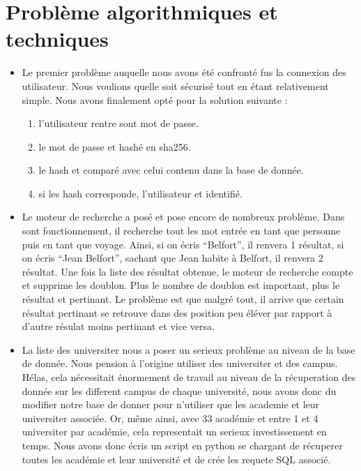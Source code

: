 \documentclass[a4paper,10pt]{report}
\begin{document}
\section{Probl\`eme algorithmiques et techniques}

\begin{itemize}
    \item Le premier problème auquelle nous avons été confronté fus la connexion des utilisateur.
    Nous voulions quelle soit sécurisé tout en étant relativement simple.
    Nous avons finalement opté pour la solution suivante : 
    \begin{enumerate}
        \item l'utilisateur rentre sont mot de passe.
        \item le mot de passe et hashé en sha256.
        \item le hash et comparé avec celui contenu dans la base de donnée.
        \item si les hash corresponde, l'utilisateur et identifié.
    \end{enumerate}
    
    \null
    
    \item Le moteur de recherche a pos\'e et pose encore de nombreux probl\`eme.
    Dans sont fonctionnement, il recherche tout les mot entr\'ee en tant que
    personne puis en tant que voyage. Ainsi, si on \'ecris ``Belfort'', il renvera 1 r\'esultat,
    si on \'ecris ``Jean Belfort'', sachant que Jean habite \`a Belfort, il renvera 2 r\'esultat.
    Une fois la liste des r\'esultat obtenue, le moteur de recherche compte et supprime
    les doublon. Plus le nombre de doublon est important, plus le r\'esultat et pertinant.
    Le probl\`eme est que malgr\'e tout, il arrive que certain r\'esultat pertinant se
    retrouve dans des position peu \'el\'ever par rapport \`a d'autre r\'esulat moins pertinant
    et vice versa.
    
    \null
    
    \item La liste des universiter nous a poser un serieux probl\`eme au niveau de la
    base de donn\'ee. Nous pension \`a l'origine utiliser des universiter et des campus.
    H\'elas, cela n\'ecessitait \'enormement de travail au niveau de la r\'ecuperation
    des donn\'ee sur les different campus de chaque universit\'e, nous avons donc du
    modifier notre base de donner pour n'utiliser que les academie et leur universiter
    associ\'ee. Or, m\^eme ainsi, avec 33 acad\'emie et entre 1 et 4 universiter par
    acad\'emie, cela representait un serieux investissement en temps. Nous avons donc
    \'ecris un script en python se chargant de r\'ecuperer toutes les acad\'emie et
    leur universit\'e et de cr\'ee les requete SQL associ\'e.
    

\end{itemize}
\end{document}
